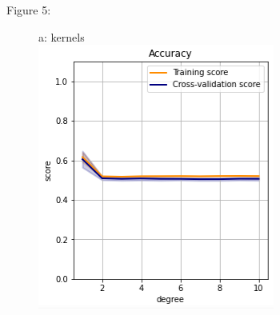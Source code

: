 \documentclass{article}
\begin{document}
\begin{figure}
	\centering
	Figure 5:\\
	\begin{subfigure}{.30\textwidth}
		\centering
		a: kernels\\
		\includegraphics[width=\linewidth]{poland_svm_poly_degree.png}
		

\end{subfigure}
\end{figure}
\end{document}
